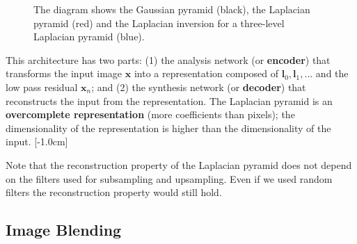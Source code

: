 \begin{figure}[h!]
{
}
\caption{The diagram shows the Gaussian pyramid (black), the Laplacian pyramid (red) and the Laplacian inversion for a three-level Laplacian pyramid (blue).}
\label{fig:laplacian_pyr_architecture}
\end{figure}





This architecture has two parts: (1) the analysis network (or {\bf encoder}) that transforms the input image $\mathbf{x}$ into a representation composed of $\mathbf{l}_0, \mathbf{l}_1, ...$ and the low pass residual $\mathbf{x}_n$; and (2) the synthesis network (or {\bf decoder}) that reconstructs the input from the representation.  The Laplacian pyramid is an {\bf overcomplete representation}
(more coefficients than pixels); the dimensionality of the representation is higher than the dimensionality of the input.
[-1.0cm]

Note that the reconstruction property of the Laplacian pyramid does not depend on the filters used for subsampling and upsampling. Even if we used random filters the reconstruction property would still hold. 


\subsection{Image Blending}

